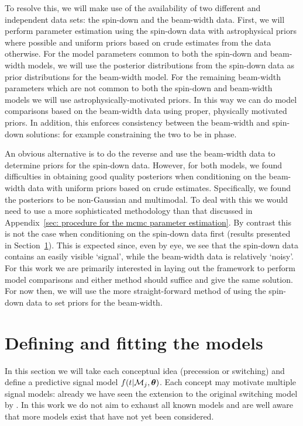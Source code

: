 \documentclass[../full_thesis/full_thesis.tex]{subfiles}
\begin{document}
To resolve this, we will make use of the availability of two different and
independent data sets: the spin-down and the beam-width data.  First, we will
perform parameter estimation using the spin-down data with astrophysical priors
where possible and uniform priors based on crude estimates from the data
otherwise. For the model parameters common to both the spin-down and
beam-width models, we will use the posterior distributions from the spin-down
data as prior distributions for the beam-width model. For the remaining
beam-width parameters which are not common to both the spin-down and beam-width
models we will use astrophysically-motivated priors. In this way we can do
model comparisons based on the beam-width data using proper, physically
motivated priors. In addition, this enforces consistency between the beam-width
and spin-down solutions: for example constraining the two to be in phase.

An obvious alternative is to do the reverse and use the beam-width data to
determine priors for the spin-down data. However, for both models, we found
difficulties in obtaining good quality posteriors when conditioning on the
beam-width data with uniform priors based on crude estimates.
Specifically, we found the posteriors to be non-Gaussian and multimodal.
To deal with this we would
need to use a more sophisticated methodology than that discussed in
Appendix~\ref{sec: procedure for the mcmc parameter estimation}. By contrast this
is not the case when conditioning on the spin-down data first (results
presented in Section~\ref{sec: defining and fitting the models}). This is expected
since, even by eye, we see that the spin-down data contains an easily visible
`signal', while the beam-width data is relatively `noisy'.  For this work we
are primarily interested in laying out the framework to perform model
comparisons and either method should suffice and give the same solution.  For
now then, we will use the more straight-forward method of using the spin-down
data to set priors for the beam-width.



\section{Defining and fitting the models}
\label{sec: defining and fitting the models}
In this section we will take each conceptual idea (precession or switching) and
define a predictive signal model $f(t|\mathcal{M}_j, \boldsymbol{\theta})$. Each concept may motivate
multiple signal models: already we have seen the extension to the original
\citet{Lyne2010} switching model by \citet{Perera2015}. In this work we do not
aim to exhaust all known models and are well aware that more models exist that
have not yet been considered.
\end{document}
